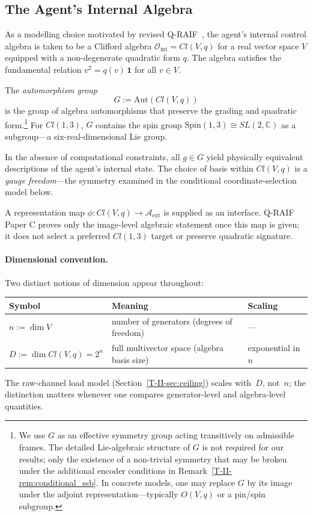 \documentclass[12pt,a4paper,openany]{book}
\begin{document}
\subsection{The Agent's Internal Algebra}
\label{T-II-subsec:algebra}

As a modelling choice motivated by revised
Q-RAIF~\cite{Liu2026QRAIF_B,Liu2026QRAIF_C},
the agent's internal control algebra is taken to be a Clifford algebra
$\mathcal{O}_{\mathrm{int}} = Cl(V,q)$
for a real vector space $V$ equipped with a non-degenerate
quadratic form $q$.
The algebra satisfies the fundamental relation
$v^2 = q(v)\,\mathbf{1}$ for all $v \in V$.

The \emph{automorphism group}
\begin{equation}
\label{T-II-eq:gauge_group}
G := \mathrm{Aut}(Cl(V,q))
\end{equation}
is the group of algebra automorphisms that preserve the
grading and quadratic form.\footnote{\label{T-II-fn:gauge_group}%
We use $G$ as an effective symmetry group acting
transitively on admissible frames.
The detailed Lie-algebraic structure of $G$ is not required
for our results; only the existence of a non-trivial
symmetry that may be broken under the additional encoder
conditions in Remark~\ref{T-II-rem:conditional_ssb}.
In concrete models, one may replace $G$ by its image
under the adjoint representation---typically
$O(V,q)$ or a pin/spin subgroup.}
For $Cl(1,3)$, $G$ contains the spin group
$\mathrm{Spin}(1,3) \cong SL(2,\mathbb{C})$
as a subgroup---a six-real-dimensional Lie group.

In the absence of computational constraints, all
$g \in G$ yield physically equivalent descriptions of
the agent's internal state.
The choice of basis within $Cl(V,q)$ is a \emph{gauge
freedom}---the symmetry examined in the conditional
coordinate-selection model below.

A representation map
$\phi:Cl(V,q)\to\mathcal A_{\mathrm{ext}}$ is supplied as an
interface.  Q-RAIF Paper C proves only the image-level algebraic
statement once this map is given; it does not select a preferred
$Cl(1,3)$ target or preserve quadratic signature.

\paragraph{Dimensional convention.}
Two distinct notions of dimension appear throughout:
\begin{center}
\small
\begin{tabular}{@{}lll@{}}
\toprule
Symbol & Meaning & Scaling \\
\midrule
$n := \dim V$ & number of generators
  (degrees of freedom) & --- \\
$D := \dim Cl(V,q) = 2^n$ & full multivector space
  (algebra basis size) & exponential in $n$ \\
\bottomrule
\end{tabular}
\end{center}
The raw-channel load model (Section~\ref{T-II-sec:ceiling})
scales with~$D$, not~$n$; the distinction matters
whenever one compares generator-level and
algebra-level quantities.
\end{document}
